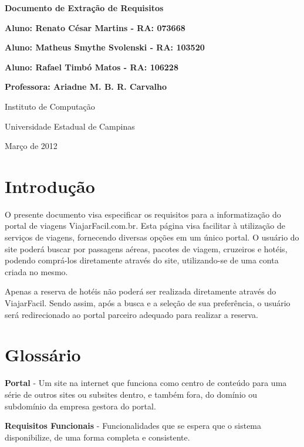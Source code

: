 \documentclass[12pt]{article}
\begin{document}
\thispagestyle{empty}
\bigskip
\bigskip
\centerline{\LARGE\bf Documento de Extração de Requisitos}
\bigskip\bigskip
\bigskip\bigskip
\bigskip\bigskip
\bigskip\bigskip
\bigskip\bigskip
\bigskip\bigskip
\bigskip\bigskip
\bigskip\bigskip
\bigskip\bigskip
\bigskip\bigskip
\bigskip\bigskip
\centerline{\large\bf Aluno: Renato César Martins - RA: 073668}
\centerline{\large\bf Aluno: Matheus Smythe Svolenski - RA: 103520}
\centerline{\large\bf Aluno: Rafael Timbó Matos - RA: 106228}
\centerline{\large\bf Professora: Ariadne M. B. R. Carvalho}
\bigskip\bigskip
\bigskip\bigskip
\bigskip\bigskip
\bigskip\bigskip
\bigskip\bigskip
\bigskip\bigskip
\bigskip\bigskip
\bigskip\bigskip
\bigskip\bigskip
\bigskip\bigskip
\centerline{\large Instituto de Computação}
\centerline{\large Universidade Estadual de Campinas}
\centerline{\large Março de 2012}
\clearpage

\section {Introdução}
\label{sec:intro}

O presente documento visa especificar os requisitos para a informatização do portal de viagens ViajarFacil.com.br. Esta página visa facilitar à utilização de serviços de viagens, fornecendo diversas opções em um único portal. O usuário do site poderá buscar por passagens aéreas, pacotes de viagem, cruzeiros e hotéis, podendo comprá-los diretamente através do site, utilizando-se de uma conta criada no mesmo.

Apenas a reserva de hotéis não poderá ser realizada diretamente através do ViajarFacil. Sendo assim, após a busca e a seleção de sua preferência, o usuário será redirecionado ao portal parceiro adequado para realizar a reserva. 

\section{Glossário}
\label{sec:glossario}

{\bf Portal} - Um site na internet que funciona como centro de conteúdo para uma série de outros sites ou subsites dentro, e também fora, do domínio ou subdomínio da empresa gestora do portal.

{\bf Requisitos Funcionais} - Funcionalidades que se espera que o sistema disponibilize, de uma forma completa e consistente.
\end{document}
